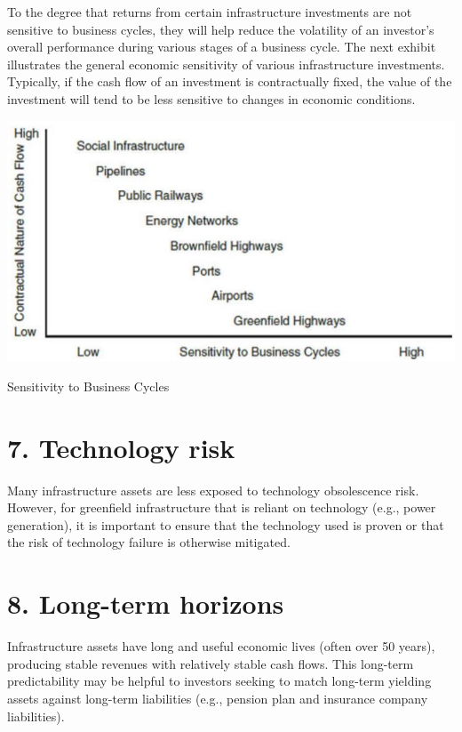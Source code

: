 \documentclass[11pt]{article}
\begin{document}
To the degree that returns from certain infrastructure investments are not sensitive to business cycles, they will help reduce the volatility of an investor's overall performance during various stages of a business cycle. The next exhibit illustrates the general economic sensitivity of various infrastructure investments. Typically, if the cash flow of an investment is contractually fixed, the value of the investment will tend to be less sensitive to changes in economic conditions.

\begin{center}
\includegraphics[max width=\textwidth]{2024_04_11_801fecba73bcef68aff8g-6}
\end{center}

Sensitivity to Business Cycles

\section*{7. Technology risk}
Many infrastructure assets are less exposed to technology obsolescence risk. However, for greenfield infrastructure that is reliant on technology (e.g., power generation), it is important to ensure that the technology used is proven or that the risk of technology failure is otherwise mitigated.

\section*{8. Long-term horizons}
Infrastructure assets have long and useful economic lives (often over 50 years), producing stable revenues with relatively stable cash flows. This long-term predictability may be helpful to investors seeking to match long-term yielding assets against long-term liabilities (e.g., pension plan and insurance company liabilities).
\end{document}
